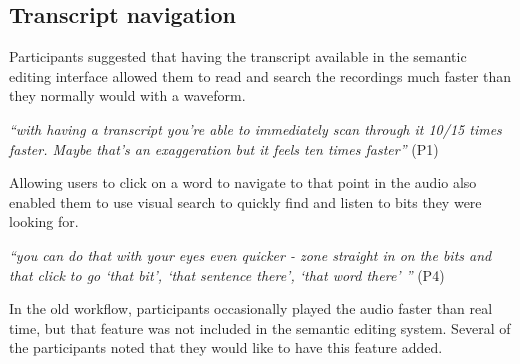 \subsection{Transcript navigation}
Participants suggested that having the transcript available in the semantic
editing interface allowed them to read and search the recordings much faster
than they normally would with a waveform.

\textit{``with having a transcript you're able to immediately scan through it
  10/15 times faster. Maybe that's an exaggeration but it feels ten times
  faster''} (P1)

Allowing users to click on a word to navigate to that point in the audio also
enabled them to use visual search to quickly find and listen to bits they were
looking for.

\textit{``you can do that with your eyes even quicker - zone straight in on the
  bits and that click to go  `that bit', `that sentence there', `that word
  there' ''} (P4)








In the old workflow, participants occasionally played the audio faster than
real time, but that feature was not included in the semantic editing system.
Several of the participants noted that they would like to have this
feature added.

